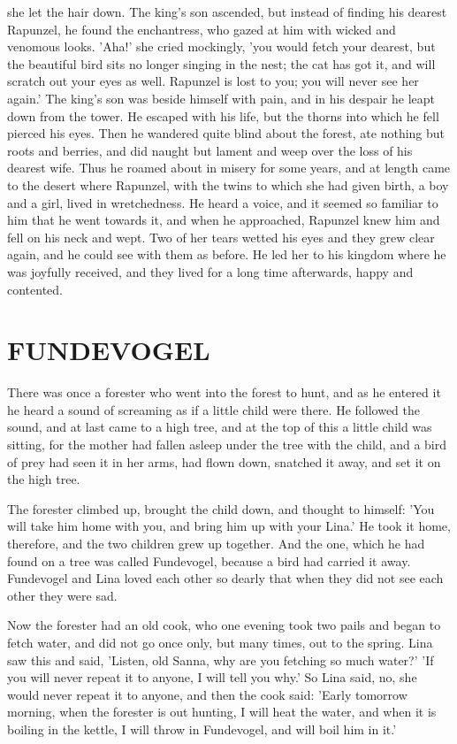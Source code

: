 \documentclass[12pt]{book}
\begin{document}
she let the hair down. The king's son ascended, but instead of finding
his dearest Rapunzel, he found the enchantress, who gazed at him with
wicked and venomous looks. 'Aha!' she cried mockingly, 'you would
fetch your dearest, but the beautiful bird sits no longer singing in
the nest; the cat has got it, and will scratch out your eyes as well.
Rapunzel is lost to you; you will never see her again.' The king's son
was beside himself with pain, and in his despair he leapt down from
the tower. He escaped with his life, but the thorns into which he fell
pierced his eyes. Then he wandered quite blind about the forest, ate
nothing but roots and berries, and did naught but lament and weep over
the loss of his dearest wife. Thus he roamed about in misery for some
years, and at length came to the desert where Rapunzel, with the twins
to which she had given birth, a boy and a girl, lived in wretchedness.
He heard a voice, and it seemed so familiar to him that he went
towards it, and when he approached, Rapunzel knew him and fell on his
neck and wept. Two of her tears wetted his eyes and they grew clear
again, and he could see with them as before. He led her to his kingdom
where he was joyfully received, and they lived for a long time
afterwards, happy and contented.



\chapter{FUNDEVOGEL}

There was once a forester who went into the forest to hunt, and as he
entered it he heard a sound of screaming as if a little child were
there. He followed the sound, and at last came to a high tree, and at
the top of this a little child was sitting, for the mother had fallen
asleep under the tree with the child, and a bird of prey had seen it
in her arms, had flown down, snatched it away, and set it on the high
tree.

The forester climbed up, brought the child down, and thought to
himself: 'You will take him home with you, and bring him up with your
Lina.' He took it home, therefore, and the two children grew up
together. And the one, which he had found on a tree was called
Fundevogel, because a bird had carried it away. Fundevogel and Lina
loved each other so dearly that when they did not see each other they
were sad.

Now the forester had an old cook, who one evening took two pails and
began to fetch water, and did not go once only, but many times, out to
the spring. Lina saw this and said, 'Listen, old Sanna, why are you
fetching so much water?' 'If you will never repeat it to anyone, I
will tell you why.' So Lina said, no, she would never repeat it to
anyone, and then the cook said: 'Early tomorrow morning, when the
forester is out hunting, I will heat the water, and when it is boiling
in the kettle, I will throw in Fundevogel, and will boil him in it.'
\end{document}
